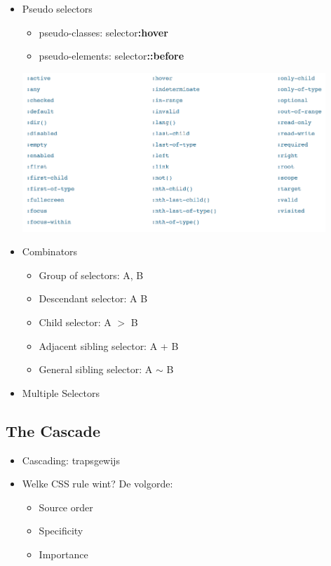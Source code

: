 \documentclass{article}
\newcommand{\bold}[1]{\textbf{#1}}
\begin{document}
\begin{itemize}
    \item Pseudo selectors
    \begin{itemize}
        \item pseudo-classes: selector\bold{:hover} 
        \item pseudo-elements: selector\bold{::before}
    \end{itemize}
    \includegraphics[width=0.9\textwidth]{img/Screenshot_20200212_152251.png}
    \item Combinators
    \begin{itemize}
        \item Group of selectors: A, B 
        \item Descendant selector: A B 
        \item Child selector: A $>$ B 
        \item Adjacent sibling selector: A + B 
        \item General sibling selector: A $\sim$ B
    \end{itemize}
    \item Multiple Selectors
\end{itemize}

\subsection{The Cascade}
\begin{itemize}
    \item Cascading: trapsgewijs
    \item Welke CSS rule wint? De volgorde:
    \begin{itemize}
        \item Source order
        \item Specificity
        \item Importance
    \end{itemize}
\end{itemize}
\end{document}
